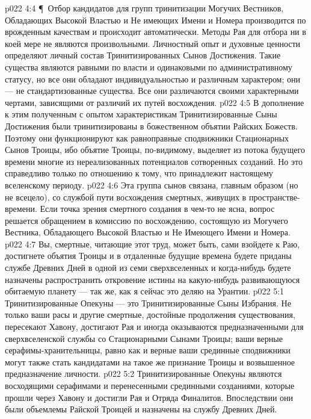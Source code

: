 \vs p022 4:4 \P\ Отбор кандидатов для групп тринитизации Могучих Вестников, Обладающих Высокой Властью и Не имеющих Имени и Номера производится по врожденным качествам и происходит автоматически. Методы Рая для отбора ни в коей мере не являются произвольными. Личностный опыт и духовные ценности определяют личный состав Тринитизированных Сынов Достижения. Такие существа являются равными по власти и одинаковыми по административному статусу, но все они обладают индивидуальностью и различным характером; они --- не стандартизованные существа. Все они различаются своими характерными чертами, зависящими от различий их путей восхождения.
\vs p022 4:5 В дополнение к этим полученным с опытом характеристикам Тринитизированные Сыны Достижения были тринитизированы в божественном объятии Райских Божеств. Поэтому они функционируют как равноправные сподвижники Стационарных Сынов Троицы, ибо объятие Троицы, по\hyp{}видимому, выделяет из потока будущего времени многие из нереализованных потенциалов сотворенных созданий. Но это справедливо только по отношению к тому, что принадлежит настоящему вселенскому периоду.
\vs p022 4:6 Эта группа сынов связана, главным образом (но не всецело), со службой пути восхождения смертных, живущих в пространстве\hyp{}времени. Если точка зрения смертного создания в чем\hyp{}то не ясна, вопрос решается обращением в комиссию по восхождению, состоящую из Могучего Вестника, Обладающего Высокой Властью и Не Имеющего Имени и Номера.
\vs p022 4:7 Вы, смертные, читающие этот труд, может быть, сами взойдете к Раю, достигнете объятия Троицы и в отдаленные будущие времена будете приданы службе Древних Дней в одной из семи сверхвселенных и когда\hyp{}нибудь будете назначены распространить откровение истины на какую\hyp{}нибудь развивающуюся обитаемую планету --- так же, как я сейчас это деляю на Урантии.
\vs p022 5:1 Тринитизированные Опекуны --- это Тринитизированные Сыны Избрания. Не только ваши расы и другие смертные, достойные продолжения существования, пересекают Хавону, достигают Рая и иногда оказываются предназначенными для сверхвселенской службы со Стационарными Сынами Троицы; ваши верные серафимы\hyp{}хранительницы, равно как и верные ваши срединные сподвижники могут также стать кандидатами на такое же признание Троицы и возвышенное предназначение личности.
\vs p022 5:2 Тринитизированные Опекуны являются восходящими серафимами и перенесенными срединными созданиями, которые прошли через Хавону и достигли Рая и Отряда Финалитов. Впоследствии они были объемлемы Райской Троицей и назначены на службу Древних Дней.

